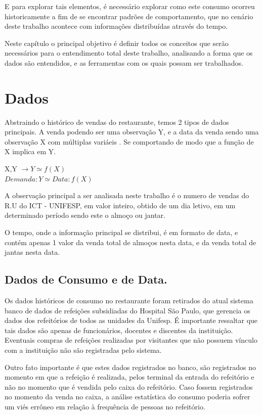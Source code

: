 \documentclass[	12pt, Times, openright, twoside, a4paper, english, brazil]{abntex2}
\begin{document}
        E para explorar tais elementos, é necessário explorar como este consumo ocorreu historicamente a fim de se encontrar padrões de comportamento, que no cenário deste trabalho acontece com informações distribuídas através do tempo. 

        Neste capítulo o principal objetivo é definir todos os conceitos que serão necessários para o entendimento total deste trabalho, analisando a forma que os dados são entendidos, e as ferramentas com os quais possam ser trabalhados.

      \section{Dados}
        Abstraindo o histórico de vendas do restaurante, temos 2 tipos de dados principais. A venda podendo ser uma observação Y, e a data da venda sendo uma observação X com múltiplas variáeis . Se comportando de modo que a função de X implica em Y. 

        X,Y $\rightarrow Y \simeq f(X) $\\
         $ Demanda:Y \simeq Data:f(X) $

        A observação principal a ser analisada neste trabalho é o numero de vendas do R.U do ICT - UNIFESP, em valor inteiro, obtido de um dia letivo, em um determinado período sendo este o almoço ou jantar.

        O tempo, onde a informação principal se distribui, é em formato de data, e contém apenas 1 valor da venda total de almoços nesta data, e da venda total de jantas nesta data.

        \subsection{Dados de Consumo e de Data.}
          Os dados históricos de consumo no restaurante foram retirados do atual sistema banco de dados de refeições subsidiadas do Hospital São Paulo, que gerencia os dados dos refeitórios de todos as unidades da Unifesp. É importante ressaltar que tais dados são apenas de funcionários, docentes e discentes da instituição. Eventuais compras de refeições realizadas por visitantes que não possuem vínculo com a instituição não são registradas pelo sistema. 

          Outro fato importante é que estes dados registrados no banco, são registrados no momento em que a refeição é realizada, pelos terminal da entrada do refeitório e não no momento que é vendida pelo caixa do refeitório. Caso fossem registrados no momento da venda no caixa, a análise estatística do consumo poderia sofrer um viés errôneo em relação à frequência de pessoas no refeitório. 
\end{document}
